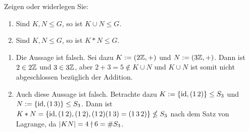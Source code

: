 \begin{exercisePage}
\begin{exercise} [Präsenz]
	Zeigen oder widerlegen Sie:
	\begin{enumerate}
		\item Sind $K,N \leq G$, so ist $K \cup N \leq G$.
		\item Sind $K,N \leq G$, so ist $K * N \leq G$.
	\end{enumerate}
\end{exercise}
\begin{solution}
	\begin{enumerate}
		\item Die Aussage ist falsch. Sei dazu $K := (2\mathbb{Z}, +)$ und $N := (3\mathbb{Z}, +)$. Dann ist $2 \in 2\mathbb{Z}$ und $3 \in 3\mathbb{Z}$, aber $2+3 = 5 \notin K \cup N$ und $K \cup N$ ist somit nicht abgeschlossen bezüglich der Addition.
		\item Auch diese Aussage ist falsch. Betrachte dazu $K:= \left\{ \operatorname{id} , (1 \, 2) \right\} \leq S_3$ und $N := \left\{ \operatorname{id} , (1 \, 3) \right\} \leq S_3$. Dann ist $K*N = \left\{ \operatorname{id}, (1 \, 2), (1 \, 2), (1 \, 2)(1 \, 3) = (1 \, 3 \, 2) \right\} \nleq S_3$ nach dem Satz von Lagrange, da $\left| KN \right| = 4 \mathrel{\nmid} 6 = \# S_3$.
	\end{enumerate}
\end{solution}

\end{exercisePage}